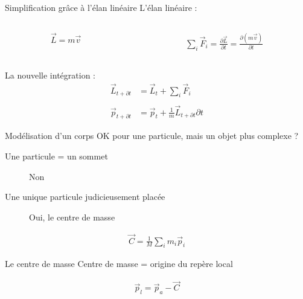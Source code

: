 \documentclass{beamer}
\newcommand{\deriv}{\partial \!}
\begin{document}
\begin{frame}{Simplification grâce à l'élan linéaire}
  L'élan linéaire :
  \begin{columns}
    \begin{column}{3cm}
      \begin{align*}
        \vec{L} = m \vec{v}
      \end{align*}
    \end{column}
    \begin{column}{3cm}
      \begin{align*}
        \sum_i \vec{F}_i = \frac{\deriv \vec{L}}{\deriv t} = \frac{\deriv (m\vec{v})}{\deriv t}
      \end{align*}
    \end{column}
  \end{columns}

  \vfill

  La nouvelle intégration :
  \begin{align*}
    \vec{L}_{t + \deriv t} &= \vec{L}_t + {\sum_i \vec{F}_i} \\ \\
    \vec{p}_{t + \deriv t} &= \vec{p}_t + \frac{1}{m}\vec{L}_{t + \deriv t} \deriv t
  \end{align*}
\end{frame}

\begin{frame}{Modélisation d'un corps}
  OK pour une particule, mais un objet plus complexe ?
  \begin{description}
  \item[Une particule = un sommet] Non
  \item[Une unique particule judicieusement placée] Oui, le centre de masse
  \end{description}

  \vfill

  \begin{align*}
    \vec{C} = \frac{1}{M} \sum_i m_i \vec{p}_i
  \end{align*}
\end{frame}

\begin{frame}{Le centre de masse}
  Centre de masse = origine du repère local

  \vfill

  \begin{figure}
    
  \end{figure}

  \vfill

  \begin{align*}
    \vec{p}_l = \vec{p}_a - \vec{C}
  \end{align*}
\end{frame}
\end{document}
